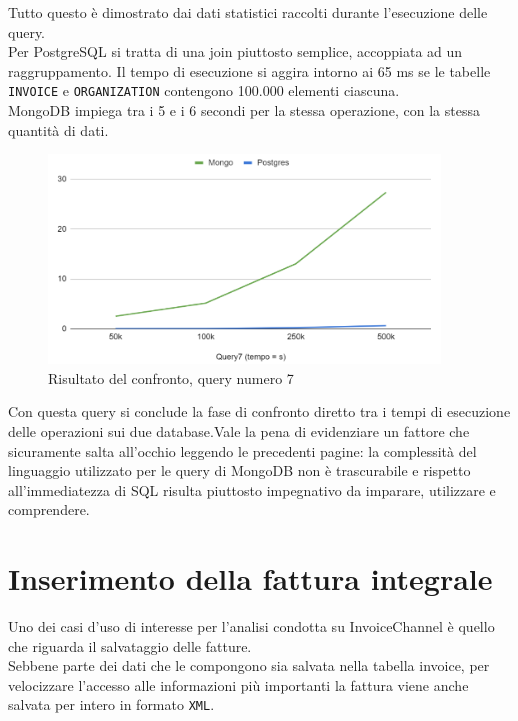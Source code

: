 \noindent Tutto questo è dimostrato dai dati statistici raccolti durante l'esecuzione delle query.\\
Per PostgreSQL si tratta di una join piuttosto semplice, accoppiata ad un raggruppamento. Il tempo di esecuzione si aggira intorno ai 65 ms se le tabelle \texttt{INVOICE} e \texttt{ORGANIZATION} contengono 100.000 elementi ciascuna.\\
MongoDB impiega tra i 5 e i 6 secondi per la stessa operazione, con la stessa quantità di dati.

\begin{figure}[htbp]
\begin{center}
\includegraphics[height=15em]{immagini/query/query7_results.png}
\caption{Risultato del confronto, query numero 7}
\end{center}
\end{figure}

\noindent Con questa query si conclude la fase di confronto diretto tra i tempi di esecuzione delle operazioni sui due database.Vale la pena di evidenziare un fattore che sicuramente salta all'occhio leggendo le precedenti pagine: la complessità del linguaggio utilizzato per le query di MongoDB non è trascurabile e rispetto all'immediatezza di \gls{SQL} risulta piuttosto impegnativo da imparare, utilizzare e comprendere.

\section{Inserimento della fattura integrale}
\label{sec:fattura-integrale}
Uno dei casi d'uso di interesse per l'analisi condotta su InvoiceChannel è quello che riguarda il salvataggio delle fatture.\\
Sebbene parte dei dati che le compongono sia salvata nella tabella invoice, per velocizzare l'accesso alle informazioni più importanti la fattura viene anche salvata per intero in formato \texttt{XML}.\\

